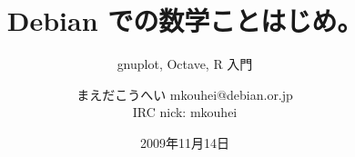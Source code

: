 




\documentclass[cjk,dvipdfmx,12pt]{beamer}
\usepackage{monthlypresentation}



\title{Debian での数学ことはじめ。}
\subtitle{gnuplot, Octave, R 入門}
\author{まえだこうへい mkouhei@debian.or.jp \\IRC nick: mkouhei}
\date{2009年11月14日}

